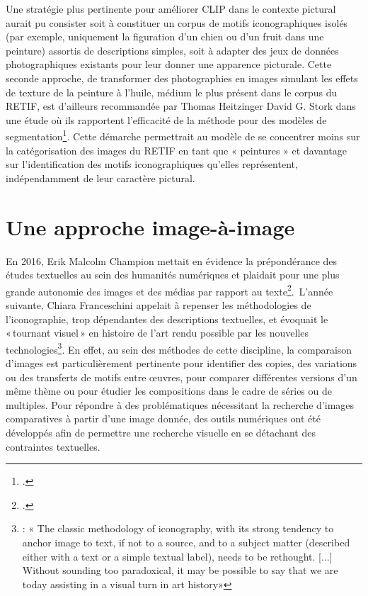 Une stratégie plus pertinente pour améliorer CLIP dans le contexte pictural aurait pu consister soit à constituer un corpus de motifs iconographiques isolés (par exemple, uniquement la figuration d’un chien ou d’un fruit dans une peinture) assortis de descriptions simples, soit à adapter des jeux de données photographiques existants pour leur donner une apparence picturale. Cette seconde approche, de transformer des photographies en images simulant les effets de texture de la peinture à l’huile, médium le plus présent dans le corpus du RETIF, est d’ailleurs recommandée par Thomas Heitzinger David G. Stork dans une étude où ils rapportent l’efficacité de la méthode pour des modèles de segmentation\footcite{heitzingerImprovingSemanticSegmentation2022}. Cette démarche permettrait au modèle de se concentrer moins sur la catégorisation des images du RETIF en tant que « peintures » et davantage sur l’identification des motifs iconographiques qu’elles représentent, indépendamment de leur caractère pictural.

\section{Une approche image-à-image}

En 2016, Erik Malcolm Champion mettait en évidence la prépondérance des études textuelles au sein des humanités numériques et plaidait pour une plus grande autonomie des images et des médias par rapport au texte\footcite{championDigitalHumanitiesText2016}.  L’année suivante, Chiara Franceschini appelait à repenser les méthodologies de l’iconographie, trop dépendantes des descriptions textuelles, et évoquait le « tournant visuel » en histoire de l’art rendu possible par les nouvelles technologies\footnote{\cite[p. 190]{franceschiniClassifyingImageContent2017} : « The classic methodology of iconography, with its strong tendency to anchor image to text, if not to a source, and to a subject matter (described either with a text or a simple textual label), needs to be rethought. [...] Without sounding too paradoxical, it may be possible to say that we are today assisting in a visual turn in art history»}. En effet, au sein des méthodes de cette discipline, la comparaison d’images est particulièrement pertinente pour identifier des copies, des variations ou des transferts de motifs entre œuvres, pour comparer différentes versions d’un même thème ou pour étudier les compositions dans le cadre de séries ou de multiples. Pour répondre à des problématiques nécessitant la recherche d’images comparatives à partir d’une image donnée, des outils numériques ont été développés afin de permettre une recherche visuelle en se détachant des contraintes textuelles.

